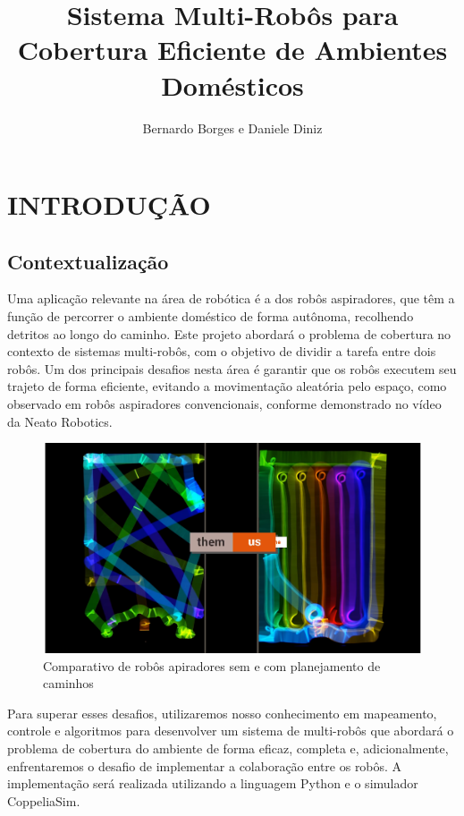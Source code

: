 \documentclass[a4paper, 10pt, conference]{ieeeconf}      %
\title{\LARGE \bf
Sistema Multi-Robôs para Cobertura Eficiente de Ambientes Domésticos
}
\author{Bernardo Borges e Daniele Diniz}
\begin{document}
\maketitle
\thispagestyle{empty}
\pagestyle{empty}


\section{INTRODUÇÃO}

\subsection{Contextualização}

Uma aplicação relevante na área de robótica é a dos robôs aspiradores, que têm a
função de percorrer o ambiente doméstico de forma autônoma, recolhendo detritos
ao longo do caminho. Este projeto abordará o problema de cobertura no contexto de
sistemas multi-robôs, com o objetivo de dividir a tarefa entre dois robôs. Um dos
principais desafios nesta área é garantir que os robôs executem seu trajeto de forma
eficiente, evitando a movimentação aleatória pelo espaço, como observado em
robôs aspiradores convencionais, conforme demonstrado no vídeo da Neato
Robotics.

\begin{figure}[htb!]
    \centering
    \includegraphics[scale=0.23]{./images/neato_compare.png}
    \caption{Comparativo de robôs apiradores sem e com planejamento de caminhos}
    \label{fig:fig9}
\end{figure}

Para superar esses desafios, utilizaremos nosso conhecimento em mapeamento,
controle e algoritmos para desenvolver um sistema de multi-robôs que abordará o
problema de cobertura do ambiente de forma eficaz, completa e, adicionalmente,
enfrentaremos o desafio de implementar a colaboração entre os robôs. A
implementação será realizada utilizando a linguagem Python e o simulador
CoppeliaSim.
\end{document}
